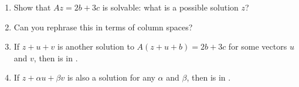 \documentclass[11pt]{article}
\begin{document}
\begin{enumerate}
\begin{enumerate}
\item Show that $Az=2b+3c$ is solvable: what is a possible solution $z$?  
\item Can you rephrase this in terms of column spaces?
\item If $z+u+v$ is another solution to $A(z+u+b)=2b+3c$ for some vectors $u$ and $v$, then \underline{\phantom{aaaaaaaaaaaa}} is in \underline{\phantom{aaaaaaaaaaaa}}.
\item If $z+\alpha u+\beta v$ is also a solution for any $\alpha$ and $\beta$, then \underline{\phantom{aaaaaaaaaaaa}} is in \underline{\phantom{aaaaaaaaaaaa}}.
\end{enumerate}











\end{enumerate}
\end{document}
